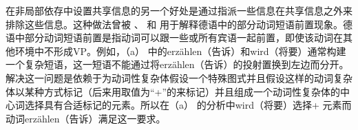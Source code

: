 在非局部依存中设置共享信息的另一个好处是通过指派一些信息在共享信息之外来排除这些信息。这种做法曾被 \citet{Hoehle94a}、 \citet{Mueller96a,Mueller2002b}和 \citet{Meurers99a}用于解释德语中的部分动词短语前置现象。德语中部分动词短语前置是指动词可以跟一些或所有宾语一起前置，即使该动词在其他环境中不形成VP。例如，（a） 中的erzählen（告诉）和wird（将要）通常构建一个复杂短语，这一短语不能通过将erzählen（告诉）的投射置换到左边而分开。
\eal
{}
\zl
 \citet{HN94a}解决这一问题是依赖于为动词性复杂体假设一个特殊图式并且假设这样的动词复杂体以某种方式标记（后来用取值为“+”的\lexfc 来标记）并且组成一个动词性复杂体的中心词选择具有合适标记的元素。所以在（a） 的分析中wird（将要）选择\lexc+ 元素而动词erzählen（告诉）满足这一要求。

